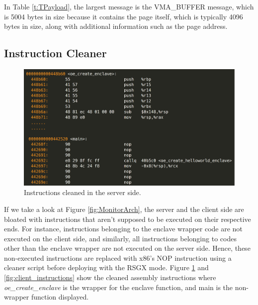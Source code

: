 \documentclass[article, doublespace,nopageskip]{VTthesis} %
\newcommand{\monitor}{RSGX \xspace}
\begin{document}
    In Table \ref{t:TPayload}, the largest message is the VMA\_BUFFER message, which is 5004 bytes in size
    because it contains the page itself, which is typically 4096 bytes in size, along with additional information such as the page address.


    \subsection{Instruction Cleaner} \label{ase:inst_cleaner}
    \begin{figure}[htb]
        \centering
        \includegraphics[scale=0.7]{figures/server_instruction_cleaned.png}
        \caption{Instructions cleaned in the server side.} 
        \label{fig:server_instructions}
    \end{figure}
    
    If we take a look at Figure \ref{fig:MonitorArch}, the server and the client side are bloated with instructions that aren't supposed to be executed on their respective ends. For instance, instructions belonging to the enclave wrapper code are not executed on the client side, and similarly, all instructions belonging to codes other than the enclave wrapper are not executed on the server side. Hence, these non-executed instructions are replaced with x86's NOP instruction using a cleaner script before deploying with the \monitor mode. Figure \ref{fig:server_instructions} and \ref{fig:client_instructions} show the cleaned assembly instructions where \textit{oe\_create\_enclave} is the wrapper for the enclave function, and main is the non-wrapper function displayed.
\end{document}
